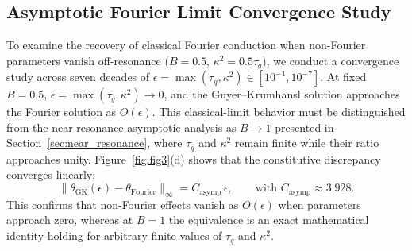 \documentclass[preprint,12pt]{elsarticle}
\begin{document}
\begin{table}[htbp]
\centering
\caption{Spatial mesh convergence study: Maximum discrepancy ($L_\infty$), root-mean-square discrepancy ($L_2$), and observed convergence order $p$ under grid refinement for $Bi = 0.100$, evaluated against the continuous Laplace solution.}
\label{tab:mesh_convergence}
\end{table}

\subsection{Asymptotic Fourier Limit Convergence Study}

To examine the recovery of classical Fourier conduction when non-Fourier parameters vanish off-resonance ($B = 0.5$, $\kappa^2 = 0.5 \tau_q$), we conduct a convergence study across seven decades of $\epsilon = \max(\tau_q, \kappa^2) \in [10^{-1}, 10^{-7}]$. At fixed $B=0.5$, $\epsilon=\max(\tau_q,\kappa^2)\to 0$, and the Guyer--Krumhansl solution approaches the Fourier solution as $O(\epsilon)$. This classical-limit behavior must be distinguished from the near-resonance asymptotic analysis as $B \to 1$ presented in Section~\ref{sec:near_resonance}, where $\tau_q$ and $\kappa^2$ remain finite while their ratio approaches unity. Figure~\ref{fig:fig3}(d) shows that the constitutive discrepancy converges linearly:
\begin{equation}
\|\theta_{\mathrm{GK}}(\epsilon) - \theta_{\mathrm{Fourier}}\|_\infty = C_{\mathrm{asymp}} \, \epsilon, \qquad \text{with } C_{\mathrm{asymp}} \approx 3.928.
\end{equation}
This confirms that non-Fourier effects vanish as $O(\epsilon)$ when parameters approach zero, whereas at $B = 1$ the equivalence is an exact mathematical identity holding for arbitrary finite values of $\tau_q$ and $\kappa^2$.
\end{document}
